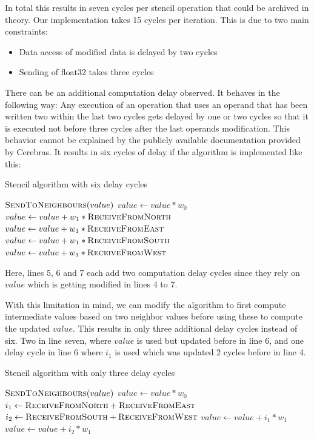 \documentclass{article}
\begin{document}
In total this results in seven cycles per stencil operation that could be archived in theory. Our implementation takes 15 cycles per iteration. This is due to two main constraints:
\begin{itemize}
    \item Data access of modified data is delayed by two cycles
    \item Sending of float32 takes three cycles
\end{itemize}
There can be an additional computation delay observed. It behaves in the following way: Any execution of an operation that uses an operand that has been written two within the last two cycles gets delayed by one or two cycles so that it is executed not before three cycles after the last operands modification. This behavior cannot be explained by the publicly available documentation provided by Cerebras. It results in six cycles of delay if the algorithm is implemented like this:
\begin{algorithm}
\caption{Stencil algorithm with six delay cycles}
\begin{algorithmic}[1]
\State $\Call{SendToNeighbours}{value}$
\State $value \gets value*w_0$
\State $value\gets value + w_1*\Call{ReceiveFromNorth}{}$
\State $value\gets value + w_1*\Call{ReceiveFromEast}{}$
\State $value\gets value + w_1*\Call{ReceiveFromSouth}{}$
\State $value\gets value + w_1*\Call{ReceiveFromWest}{}$
\EndProcedure
\end{algorithmic}
\end{algorithm}
Here, lines 5, 6 and 7 each add two computation delay cycles since they rely on $value$ which is getting modified in lines 4 to 7.

With this limitation in mind, we can modify the algorithm to first compute intermediate values based on two neighbor values before using these to compute the updated $value$. This results in only three additional delay cycles instead of six. Two in line seven, where $value$ is used but updated before in line 6, and one delay cycle in line 6 where $i_1$ is used which was updated 2 cycles before in line 4.
\begin{algorithm}
\caption{Stencil algorithm with only three delay cycles}
\begin{algorithmic}[1]
\State $\Call{SendToNeighbours}{value}$
\State $value \gets value*w_0$
\State $i_1 \gets \Call{ReceiveFromNorth}{} + \Call{ReceiveFromEast}{}$
\State $i_2 \gets \Call{ReceiveFromSouth}{} + \Call{ReceiveFromWest}{}$
\State $value \gets value +i_1*w_1$
\State $value \gets value +i_2*w_1$
\EndProcedure
\end{algorithmic}
\end{algorithm}
\end{document}
